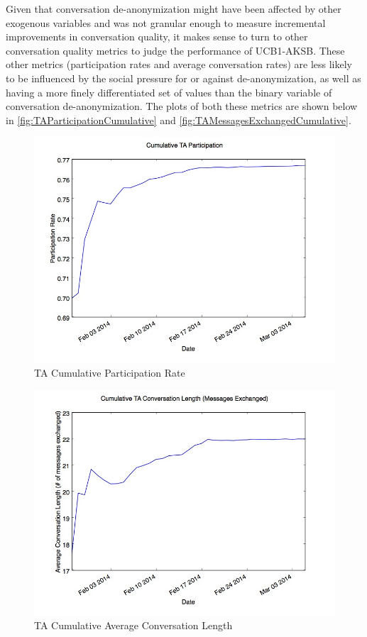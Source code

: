 Given that conversation de-anonymization might have been affected by other exogenous variables and was not granular enough to measure incremental improvements in conversation quality, it makes sense to turn to other conversation quality metrics to judge the performance of UCB1-AKSB. These other metrics (participation rates and average conversation rates) are less likely to be influenced by the social pressure for or against de-anonymization, as well as having a more finely differentiated set of values than the binary variable of conversation de-anonymization. The plots of both these metrics are shown below in \autoref{fig:TAParticipationCumulative} and \autoref{fig:TAMessagesExchangedCumulative}.

\begin{figure}[H]
\centering
\includegraphics[trim= 0mm 0mm 0mm 0mm, clip, scale=0.5]{./Figures/CumulativeTAParticipation.jpg}
\caption{TA Cumulative Participation Rate}
\label{fig:TAParticipationCumulative}
\end{figure}

\begin{figure}[H]
\centering
\includegraphics[trim= 0mm 0mm 0mm 0mm, clip, scale=0.5]{./Figures/CumulativeTAConversationLength(MessagesExchanged).jpg}
\caption{TA Cumulative Average Conversation Length}
\label{fig:TAMessagesExchangedCumulative}
\end{figure}

